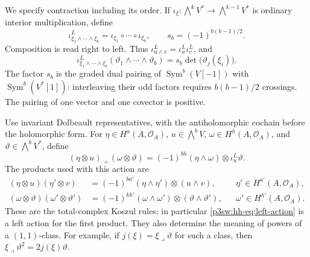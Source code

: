 \documentclass[11pt]{article}
\numberwithin{equation}{section}
\begin{document}
We specify contraction including its order.  If
\(\iota_\xi:\bigwedge^kV^*\to\bigwedge^{k-1}V^*\) is ordinary
interior multiplication, define
\begin{equation}
 \iota^L_{\xi_1\wedge\cdots\wedge\xi_b}
   =\iota_{\xi_1}\circ\cdots\circ\iota_{\xi_b},
 \qquad s_b=(-1)^{b(b-1)/2}.
\label{p3sw:hh-eq:left-interior}
\end{equation}
Composition is read right to left.  Thus
\(\iota^L_{u\wedge v}=\iota^L_u\iota^L_v\), and
\[
 \iota^L_{\xi_1\wedge\cdots\wedge\xi_b}
       (\vartheta_1\wedge\cdots\wedge\vartheta_b)
   =s_b\det\bigl(\vartheta_j(\xi_i)\bigr).
\]
The factor \(s_b\) is the graded dual pairing of
\(\operatorname{Sym}^b(V[-1])\) with
\(\operatorname{Sym}^b(V^*[1])\): interleaving their odd factors
requires \(b(b-1)/2\) crossings.  The pairing of one vector and one
covector is positive.

Use invariant Dolbeault representatives, with the antiholomorphic
cochain before the holomorphic form.  For
\(\eta\in H^a(A,\mathcal O_A)\), \(u\in\bigwedge^bV\),
\(\omega\in H^h(A,\mathcal O_A)\), and
\(\vartheta\in\bigwedge^kV^*\), define
\begin{equation}
 (\eta\otimes u)\mathbin{\lrcorner}(\omega\otimes\vartheta)
   =(-1)^{bh}(\eta\wedge\omega)\otimes\iota^L_u\vartheta.
\label{p3sw:hh-eq:left-action}
\end{equation}
The products used with this action are
\begin{equation}
\begin{aligned}
 (\eta\otimes u)(\eta'\otimes v)
   &=(-1)^{b a'}(\eta\wedge\eta')\otimes(u\wedge v),
       &&\eta'\in H^{a'}(A,\mathcal O_A),\\
 (\omega\otimes\vartheta)(\omega'\otimes\vartheta')
   &=(-1)^{k h'}(\omega\wedge\omega')
                         \otimes(\vartheta\wedge\vartheta'),
       &&\omega'\in H^{h'}(A,\mathcal O_A).
\end{aligned}
\label{p3sw:hh-eq:products}
\end{equation}
These are the total-complex Koszul rules; in particular
\eqref{p3sw:hh-eq:left-action} is a left action for the first product.
They also determine the meaning of powers of a \((1,1)\)-class.
For example, if \(j(\xi)=\xi\mathbin{\lrcorner}\vartheta\) for such a
class, then
\(\xi\mathbin{\lrcorner}\vartheta^2=2j(\xi)\vartheta\).
\end{document}
